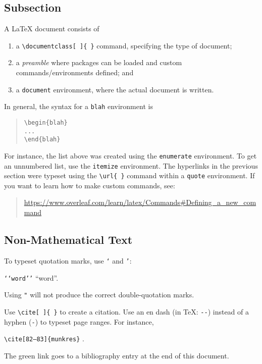 \documentclass[a4paper,10pt,leqno]{article}
\numberwithin{equation}{section}
\theoremstyle{plain}
\theoremstyle{definition}
\theoremstyle{remark}
\begin{document}
\subsection{Subsection}

A \LaTeX{} document consists of
\begin{enumerate} 
\item 	a \verb|\documentclass[ ]{ }| command, specifying the type of document; 

\item 	a \emph{preamble} where packages can be loaded and custom commands/environments defined; and

\item 	a \texttt{document} environment, where the actual document is written.

\end{enumerate}
In general, the syntax for a \texttt{blah} environment is
\begin{quote}
	\verb|\begin{blah}|\\
		\verb|...|\\
		\verb|\end{blah}|
\end{quote}
For instance, the list above was created using the \texttt{enumerate} environment.
To get an unnumbered list, use the \texttt{itemize} environment.
The hyperlinks in the previous section were typeset using the \verb|\url{ }| command within a \texttt{quote} environment.
If you want to learn how to make custom commands, see:
\begin{quote}
\url{https://www.overleaf.com/learn/latex/Commands#Defining_a_new_command}
\end{quote}

\subsection{Non-Mathematical Text}

To typeset quotation marks, use \texttt{`} and \texttt{'}:
\begin{center}
	\texttt{`{}`word'{}'}
	\quad
	``word''.
\end{center}
Using \texttt{"} will not produce the correct double-quotation marks.

Use \texttt{\textbackslash{}cite[ ]\{ \}} to create a citation.
Use an en dash (in \TeX: \texttt{-{}-}) instead of a hyphen (\texttt{-}) to typeset page ranges.
For instance,
\begin{center}
	\texttt{\textbackslash{}cite[82--83]\{munkres\}}
	\quad
	\cite[82--83]{munkres}.
\end{center}
The green link goes to a bibliography entry at the end of this document.
\end{document}
